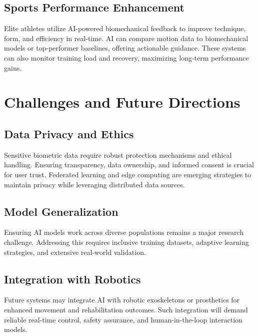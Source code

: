 \documentclass[a4paper,10pt,twocolumn]{memoir}
\begin{document}
\subsection{Sports Performance Enhancement}
Elite athletes utilize AI-powered biomechanical feedback to improve technique, form, and efficiency in real-time. AI can compare motion data to biomechanical models or top-performer baselines, offering actionable guidance. These systems can also monitor training load and recovery, maximizing long-term performance gains.


\section*{Challenges and Future Directions}

\subsection{Data Privacy and Ethics}
Sensitive biometric data require robust protection mechanisms and ethical handling. Ensuring transparency, data ownership, and informed consent is crucial for user trust. Federated learning and edge computing are emerging strategies to maintain privacy while leveraging distributed data sources.

\subsection{Model Generalization}
Ensuring AI models work across diverse populations remains a major research challenge. Addressing this requires inclusive training datasets, adaptive learning strategies, and extensive real-world validation.

\subsection{Integration with Robotics}
Future systems may integrate AI with robotic exoskeletons or prosthetics for enhanced movement and rehabilitation outcomes. Such integration will demand reliable real-time control, safety assurance, and human-in-the-loop interaction models.

\end{document}
